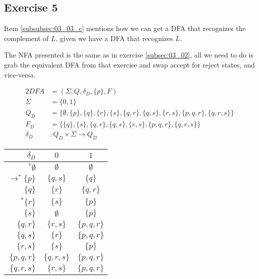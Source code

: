 {\subsection{Exercise 5}
\begin{remark}
	Item \ref{subsubsec:03_03_c} mentions how we can get a DFA that recognizes the complement of $L$, given we have a DFA that recognizes $L$.
\end{remark}
\begin{remark}
	The NFA presented is the same as in exercise \ref{subsec:03_02}, all we need to do is grab the equivalent DFA from that exercise and swap accept for reject states, and vice-versa.
\end{remark}
\begin{alignat*}{2}
	DFA       &= (\Sigma, Q, \delta_D, \{p\}, F)\\
	\Sigma    &= \{0,1\}\\
	Q_D       &= \{\emptyset,\{p\},\{q\},\{r\},\{s\},\{q,r\},\{q,s\},\{r,s\},\{p,q,r\},\{q,r,s\}\}\\
	F_D       &= \{\{q\},\{s\},\{q,r\},\{q,s\},\{r,s\},\{p,q,r\},\{q,r,s\}\}\\
	\delta_D &\colon Q_D \times \Sigma \rightarrow Q_D
\end{alignat*}
\begin{center}
\begin{tabular}{ r | c c }
 $\delta_D$ & $0$ & $1$ \\
 \hline
 $^* \emptyset             $ & $\emptyset  $ & $\emptyset  $ \\
 $\rightarrow^* \{p      \}$ & $\{  q,  s\}$ & $\{  q    \}$ \\  
 $                 \{  q    \}$ & $\{    r  \}$ & $\{  q,r  \}$ \\
 $^*            \{    r  \}$ & $\{      s\}$ & $\{p      \}$ \\
 $                 \{      s\}$ & $\emptyset  $ & $\{p      \}$ \\
 $                 \{  q,r  \}$ & $\{    r,s\}$ & $\{p,q,r  \}$ \\
 $                 \{  q,  s\}$ & $\{    r  \}$ & $\{p,q,r  \}$ \\
 $                 \{    r,s\}$ & $\{      s\}$ & $\{p      \}$ \\
 $                 \{p,q,r  \}$ & $\{  q,r,s\}$ & $\{p,q,r  \}$ \\
 $                 \{  q,r,s\}$ & $\{    r,s\}$ & $\{p,q,r  \}$
\end{tabular}
\end{center}
\pagebreak
}
